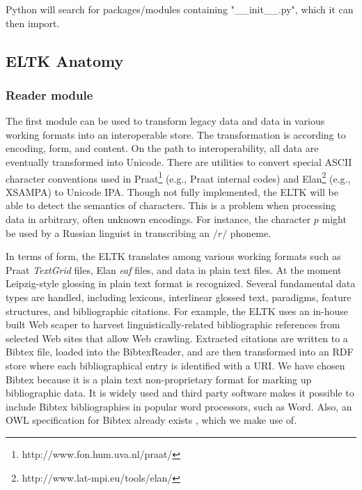 \documentclass[]{article}
\begin{document}
Python will search for packages/modules containing "\_\_init\_\_.py", which it can then import.




\subsection{ELTK Anatomy}\label{sec:eltk_anatomy}

\subsubsection{Reader module}

The first module can be used to transform legacy data and data in various working formats into an interoperable store. The transformation is according to encoding, form, and content. On the path to interoperability, all data are eventually transformed into Unicode. There are utilities to convert special ASCII character conventions used in Praat\footnote{http://www.fon.hum.uva.nl/praat/} (e.g., Praat internal codes) and Elan\footnote{http://www.lat-mpi.eu/tools/elan/} (e.g., XSAMPA) to Unicode IPA. Though not fully implemented, the ELTK will be able to detect the semantics of characters. This is a problem when processing data in arbitrary, often unknown encodings. For instance, the character $p$ might be used by a Russian linguist in transcribing  an $/r/$ phoneme. 

In terms of form, the ELTK translates among various working formats such as Praat \textit{TextGrid} files, Elan \textit{eaf} files, and data in plain text files. At the moment Leipzig-style glossing in plain text format is recognized. Several fundamental data types are handled, including lexicons, interlinear glossed text, paradigms, feature structures, and bibliographic citations. For example, the ELTK uses an in-house built Web scaper to harvest linguistically-related bibliographic references from selected Web sites that allow Web crawling. Extracted citations are written to a Bibtex file, loaded into the BibtexReader, and are then transformed into an RDF store where each bibliographical entry is identified with a URI. We have chosen Bibtex because it is a plain text non-proprietary format for marking up bibliographic data. It is widely used and third party software makes it possible to include Bibtex bibliographies in popular word processors, such as Word. Also, an OWL specification for Bibtex already exists \cite{Knouf2004}, which we make use of.
\end{document}
